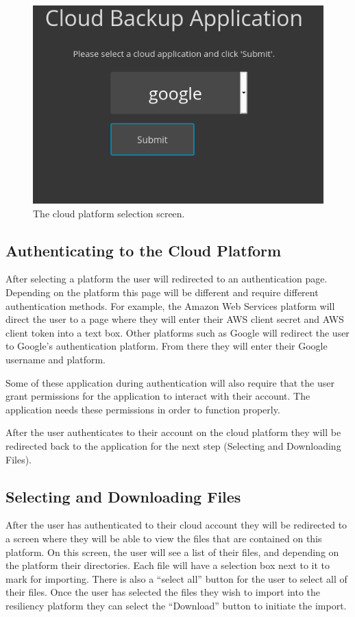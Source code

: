 \documentclass{article}
\begin{document}
      \begin{figure}[H]
        \includegraphics[scale=.75]{ug_cloud}
        \centering
        \caption{The cloud platform selection screen.}
      \end{figure}

      \subsection{Authenticating to the Cloud Platform}
      After selecting a platform the user will redirected to an authentication page. Depending on the platform this page will be different and require different authentication methods.
      For example, the Amazon Web Services platform will direct the user to a page where they will enter their AWS client secret and AWS client token into a text box. Other platforms such as Google
      will redirect the user to Google's authentication platform. From there they will enter their Google username and platform.

      Some of these application during authentication will also require that the user grant permissions for the application to interact with their account. The application needs these permissions in order
      to function properly.

      After the user authenticates to their account on the cloud platform they will be redirected back to the application for the next step (Selecting and Downloading Files).

      \subsection{Selecting and Downloading Files}
      After the user has authenticated to their cloud account they will be redirected to a screen where they will be able to view the files that are contained on this platform. On this screen, the user will
      see a list of their files, and depending on the platform their directories. Each file will have a selection box next to it to mark for importing. There is also a ``select all'' button for the user to select
      all of their files. Once the user has selected the files they wish to import into the resiliency platform they can select the ``Download'' button to initiate the import.
\end{document}
